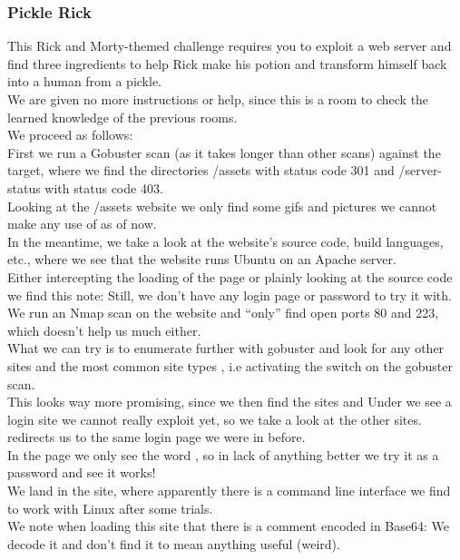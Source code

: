 \subsubsection*{Pickle Rick}
This Rick and Morty-themed challenge requires you to exploit a web server and find three ingredients to help Rick make his potion and transform himself back into a human from a pickle.\\

We are given no more instructions or help, since this is a room to check the learned knowledge of the previous rooms.\\
We proceed as follows: \\
First we run a Gobuster scan (as it takes longer than other scans) against the target, where we find the directories /assets with status code 301 and /server-status with status code 403.\\
Looking at the /assets website we only find some gifs and pictures we cannot make any use of as of now.\\

In the meantime, we take a look at the website's source code, build languages, etc., where we see that the website runs Ubuntu on an Apache server.\\
Either intercepting the loading of the page or plainly looking at the source code we find this note:
Still, we don't have any login page or password to try it with.\\

We run an Nmap scan on the website and ``only'' find open ports 80 and 223,  which doesn't help us much either.\\

What we can try is to enumerate further with gobuster and look for any other sites and the most common site types , i.e activating the  switch on the gobuster scan.\\
This looks way more promising, since we then find the sites  and 
Under  we see a login site we cannot really exploit yet, so we take a look at the other sites.\\
 redirects us to the same login page we were in before.\\
In the page  we only see the word , so in lack of anything better we try it as a password and see it works!\\
We land in the  site, where apparently there is a command line interface we find to work with Linux after some trials.\\
We note when loading this site that there is a comment encoded in Base64: 
We decode it and don't find it to mean anything useful (weird).\\

